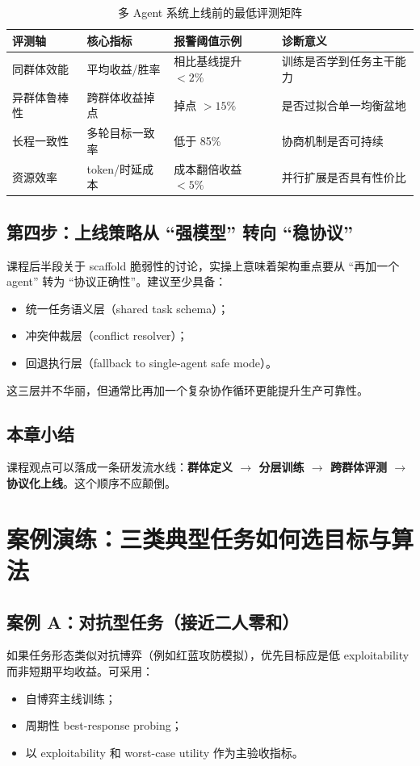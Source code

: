 \documentclass[a4paper]{article}
\begin{document}
\begin{table}[H]
\centering
\begin{tabular}{p{3.2cm}p{3.0cm}p{3.0cm}p{3.8cm}}
\toprule
\textbf{评测轴} & \textbf{核心指标} & \textbf{报警阈值示例} & \textbf{诊断意义} \\
\midrule
同群体效能 & 平均收益/胜率 & 相比基线提升 $<2\%$ & 训练是否学到任务主干能力 \\
异群体鲁棒性 & 跨群体收益掉点 & 掉点 $>15\%$ & 是否过拟合单一均衡盆地 \\
长程一致性 & 多轮目标一致率 & 低于 85\% & 协商机制是否可持续 \\
资源效率 & token/时延成本 & 成本翻倍收益 $<5\%$ & 并行扩展是否具有性价比 \\
\bottomrule
\end{tabular}
\caption{多 Agent 系统上线前的最低评测矩阵}
\end{table}

\subsection{第四步：上线策略从 ``强模型'' 转向 ``稳协议''}
课程后半段关于 scaffold 脆弱性的讨论，实操上意味着架构重点要从 ``再加一个 agent'' 转为 ``协议正确性''。建议至少具备：
\begin{itemize}
    \item 统一任务语义层（shared task schema）；
    \item 冲突仲裁层（conflict resolver）；
    \item 回退执行层（fallback to single-agent safe mode）。
\end{itemize}

这三层并不华丽，但通常比再加一个复杂协作循环更能提升生产可靠性。

\subsection{本章小结}
课程观点可以落成一条研发流水线：\textbf{群体定义 $\rightarrow$ 分层训练 $\rightarrow$ 跨群体评测 $\rightarrow$ 协议化上线}。这个顺序不应颠倒。

\section{案例演练：三类典型任务如何选目标与算法}

\subsection{案例 A：对抗型任务（接近二人零和）}
如果任务形态类似对抗博弈（例如红蓝攻防模拟），优先目标应是低 exploitability 而非短期平均收益。可采用：
\begin{itemize}
    \item 自博弈主线训练；
    \item 周期性 best-response probing；
    \item 以 exploitability 和 worst-case utility 作为主验收指标。
\end{itemize}
\end{document}
